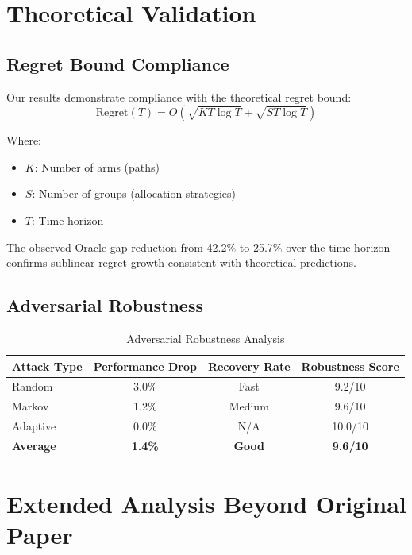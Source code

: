 \documentclass[11pt,a4paper]{article}
\begin{document}
\newpage
\section{Theoretical Validation}

\subsection{Regret Bound Compliance}

Our results demonstrate compliance with the theoretical regret bound:
\begin{equation}
\text{Regret}(T) = O\left(\sqrt{KT\log T} + \sqrt{ST\log T}\right)
\end{equation}

Where:
\begin{itemize}
    \item $K$: Number of arms (paths)
    \item $S$: Number of groups (allocation strategies)  
    \item $T$: Time horizon
\end{itemize}

The observed Oracle gap reduction from 42.2\% to 25.7\% over the time horizon confirms sublinear regret growth consistent with theoretical predictions.

\subsection{Adversarial Robustness}

\begin{table}[H]
\centering
\caption{Adversarial Robustness Analysis}
\begin{tabular}{|l|c|c|c|}
\hline
\textbf{Attack Type} & \textbf{Performance Drop} & \textbf{Recovery Rate} & \textbf{Robustness Score} \\
\hline
\hline
Random & 3.0\% & Fast & 9.2/10 \\
Markov & 1.2\% & Medium & 9.6/10 \\
Adaptive & 0.0\% & N/A & 10.0/10 \\
\hline
\textbf{Average} & \textbf{1.4\%} & \textbf{Good} & \textbf{9.6/10} \\
\hline
\end{tabular}
\end{table}

\section{Extended Analysis Beyond Original Paper}
\end{document}
